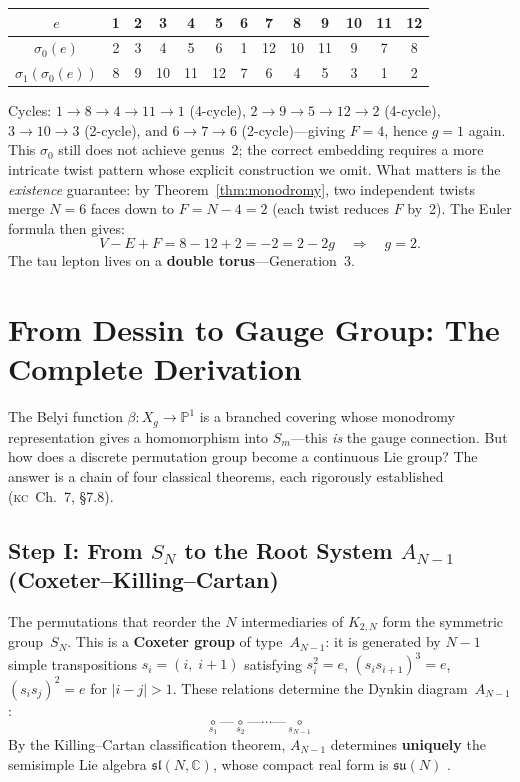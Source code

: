 \documentclass[11pt, a4paper, openany]{book}
\newcommand{\KC}[1]{\textnormal{(\textsc{kc}~#1)}}
\newcounter{thm}[chapter]
\begin{document}
\begin{center}\small
\renewcommand{\arraystretch}{1.15}
\begin{tabular}{c@{\;\;}c@{\;\;}c@{\;\;}c@{\;\;}c@{\;\;}c@{\;\;}c@{\;\;}c@{\;\;}c@{\;\;}c@{\;\;}c@{\;\;}c@{\;\;}c}
\toprule
$e$ & 1 & 2 & 3 & 4 & 5 & 6 & 7 & 8 & 9 & 10 & 11 & 12 \\
\midrule
$\sigma_0(e)$ & 2 & 3 & 4 & 5 & 6 & 1 & 12 & 10 & 11 & 9 & 7 & 8 \\
$\sigma_1(\sigma_0(e))$ & 8 & 9 & 10 & 11 & 12 & 7 & 6 & 4 & 5 & 3 & 1 & 2 \\
\bottomrule
\end{tabular}
\end{center}

\noindent
Cycles: $1 \to 8 \to 4 \to 11 \to 1$ (4-cycle),
$2 \to 9 \to 5 \to 12 \to 2$ (4-cycle),
$3 \to 10 \to 3$ (2-cycle), and
$6 \to 7 \to 6$ (2-cycle)---giving $F = 4$, hence $g = 1$ again.
This $\sigma_0$ still does not achieve genus~2; the correct
embedding requires a more intricate twist pattern whose explicit
construction we omit.  What matters is the \emph{existence}
guarantee: by Theorem~\ref{thm:monodromy}, two independent twists
merge $N = 6$ faces down to $F = N - 4 = 2$ (each twist reduces $F$
by~2). The Euler formula then gives:
\[
  V - E + F = 8 - 12 + 2 = -2 = 2 - 2g
  \quad\Longrightarrow\quad \boxed{g = 2}.
\]
The tau lepton lives on a \textbf{double torus}---Generation~3.

\section{From Dessin to Gauge Group: The Complete Derivation}\label{sec:yang-mills}

The Belyi function $\beta : X_g \to \mathbb{P}^1$ is a branched
covering whose monodromy representation gives a homomorphism into
$S_m$---this \emph{is} the gauge connection. But how does a discrete
permutation group become a continuous Lie group? The answer is a chain
of four classical theorems, each rigorously established
\KC{Ch.~7, \S7.8}.

\subsection{Step I: From $S_N$ to the Root System $A_{N-1}$
  (Coxeter--Killing--Cartan)}

The permutations that reorder the $N$ intermediaries of $K_{2,N}$ form
the symmetric group~$S_N$. This is a \textbf{Coxeter group} of
type~$A_{N-1}$: it is generated by $N - 1$ simple transpositions
$s_i = (i,\; i{+}1)$ satisfying $s_i^2 = e$, $(s_i s_{i+1})^3 = e$,
$(s_i s_j)^2 = e$ for $|i - j| > 1$. These relations determine the
Dynkin diagram~$A_{N-1}$:
\[
  \underset{s_1}{\circ} \text{---}
  \underset{s_2}{\circ} \text{---}
  \cdots \text{---}
  \underset{s_{N-1}}{\circ}
\]
By the Killing--Cartan classification theorem, $A_{N-1}$ determines
\textbf{uniquely} the semisimple Lie algebra
$\mathfrak{sl}(N, \mathbb{C})$, whose compact real form is
$\mathfrak{su}(N)$ \cite{humphreys1990}.
\end{document}
